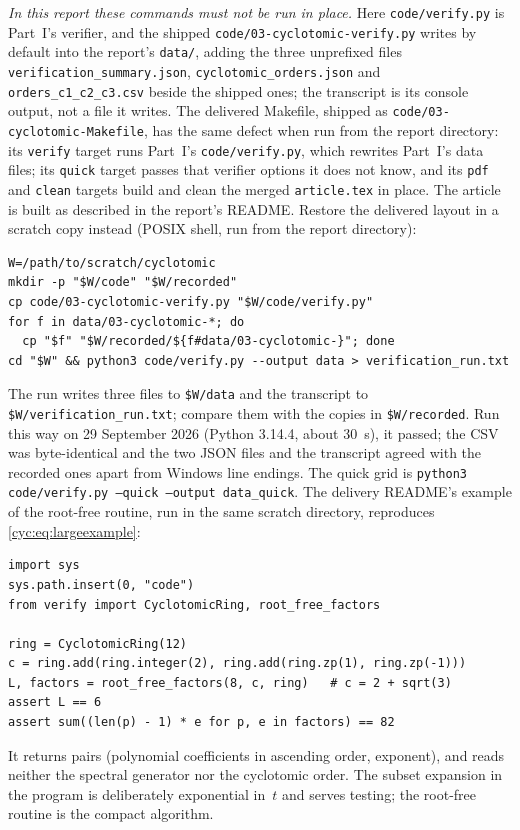 \documentclass[11pt,a4paper]{article}
\numberwithin{equation}{section}
\theoremstyle{definition}
\theoremstyle{remark}
\begin{document}
\emph{In this report these commands must not be run in place.}  Here
\nolinkurl{code/verify.py} is Part~I's verifier, and the shipped
\nolinkurl{code/03-cyclotomic-verify.py} writes by default into the
report's \nolinkurl{data/}, adding the three unprefixed files
\nolinkurl{verification_summary.json}, \nolinkurl{cyclotomic_orders.json}
and \nolinkurl{orders_c1_c2_c3.csv} beside the shipped ones; the
transcript is its console output, not a file it writes.  The delivered
Makefile, shipped as \nolinkurl{code/03-cyclotomic-Makefile}, has the same
defect when run from the report directory: its \texttt{verify} target runs
Part~I's \nolinkurl{code/verify.py}, which rewrites Part~I's data files;
its \texttt{quick} target passes that
verifier options it does not know, and its \texttt{pdf} and
\texttt{clean} targets build and clean the merged \nolinkurl{article.tex}
in place.  The article is built as described in the report's README.
Restore the delivered layout in a scratch copy instead (POSIX shell, run
from the report directory):
\begin{lstlisting}
W=/path/to/scratch/cyclotomic
mkdir -p "$W/code" "$W/recorded"
cp code/03-cyclotomic-verify.py "$W/code/verify.py"
for f in data/03-cyclotomic-*; do
  cp "$f" "$W/recorded/${f#data/03-cyclotomic-}"; done
cd "$W" && python3 code/verify.py --output data > verification_run.txt
\end{lstlisting}
The run writes three files to \texttt{\$W/data} and the transcript to
\texttt{\$W/verification\_run.txt}; compare them with the copies in
\texttt{\$W/recorded}.  Run this way on 29 September 2026 (Python 3.14.4,
about 30~s), it passed; the CSV was byte-identical and the two JSON files
and the transcript agreed with the recorded ones apart from Windows line
endings.  The quick grid is \texttt{python3 code/verify.py --quick
--output data\_quick}.  The delivery README's example of the root-free
routine, run in the same scratch directory, reproduces
\eqref{cyc:eq:largeexample}:
\begin{lstlisting}
import sys
sys.path.insert(0, "code")
from verify import CyclotomicRing, root_free_factors

ring = CyclotomicRing(12)
c = ring.add(ring.integer(2), ring.add(ring.zp(1), ring.zp(-1)))
L, factors = root_free_factors(8, c, ring)   # c = 2 + sqrt(3)
assert L == 6
assert sum((len(p) - 1) * e for p, e in factors) == 82
\end{lstlisting}
It returns pairs (polynomial coefficients in ascending order, exponent),
and reads neither the spectral generator nor the cyclotomic order.  The
subset expansion in the program is deliberately exponential in~$t$ and
serves testing; the root-free routine is the compact algorithm.
\end{document}
